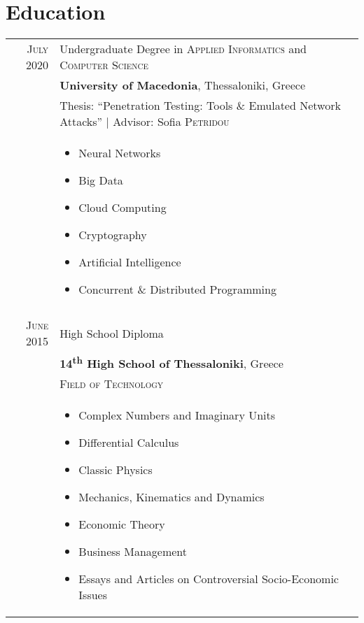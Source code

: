 \documentclass[a4paper,10pt]{article}
\begin{document}
\section{Education}
\begin{tabular}{rp{11cm}}	
\textsc{July} 2020& Undergraduate Degree in \textsc{Applied Informatics} and \textsc{Computer Science} \\& \normalsize\textbf{University of Macedonia}, Thessaloniki, Greece\\
& Thesis: ``Penetration Testing: Tools \& Emulated Network Attacks'' | \small Advisor: Sofia \textsc{Petridou}\\
&\normalsize
\begin{itemize}
    \item Neural Networks
    \item Big Data
    \item Cloud Computing
    \item Cryptography
    \item Artificial Intelligence
    \item Concurrent \& Distributed Programming
\end{itemize} \\ \\
\textsc{June} 2015 & High School Diploma \\& \textbf{14\textsuperscript{th} High School of Thessaloniki}, Greece\\
&\textsc{Field of Technology}\\&
\begin{itemize}
    \item Complex Numbers and Imaginary Units
    \item Differential Calculus
    \item Classic Physics
    \item Mechanics, Kinematics and Dynamics
    \item Economic Theory
    \item Business Management
    \item Essays and Articles on Controversial Socio-Economic Issues
\end{itemize}
\\
\end{tabular}

\end{document}
